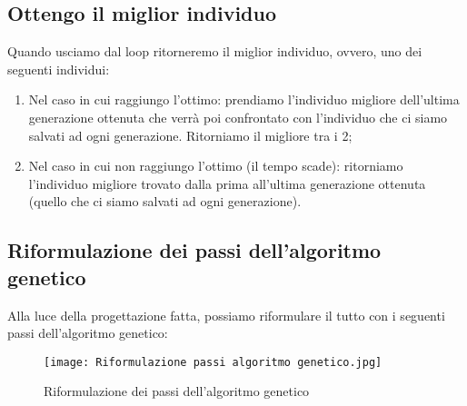\documentclass[10pt,a4paper]{article}
\begin{document}
    \subsection{Ottengo il miglior individuo}
    \label{ottengoMigliorIndividuoSubsection}
    Quando usciamo dal loop ritorneremo il miglior individuo, ovvero, uno dei seguenti individui:
    \begin{enumerate}
      \item Nel caso in cui raggiungo l'ottimo: prendiamo l'individuo migliore dell'ultima generazione ottenuta che verrà poi confrontato 
      con l'individuo che ci siamo salvati ad ogni generazione. Ritorniamo il migliore tra i 2;
      \item Nel caso in cui non raggiungo l'ottimo (il tempo scade):  ritorniamo l'individuo migliore trovato dalla 
      prima all'ultima generazione ottenuta (quello che ci siamo salvati ad ogni generazione).
    \end{enumerate}
    
    \subsection{Riformulazione dei passi dell'algoritmo genetico}
    \label{riformulazioneDeiPassiAlgoritmoGeneticoSubsection}
    Alla luce della progettazione fatta, possiamo riformulare il tutto con i seguenti passi 
    dell'algoritmo genetico: 
    \begin{figure}[h!]
      \centering
      \caption{Riformulazione dei passi dell'algoritmo genetico}
      \texttt{[image: Riformulazione passi algoritmo genetico.jpg]}
      \label{Riformulazione passi algoritmo genetico}
    \end{figure}
     
\end{document}
